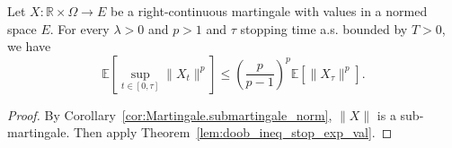 \begin{corollary}\label{cor:doob_ineq_stop_exp_val}
  Let $X:\mathbb{R}\times\Omega\rightarrow E$ be a right-continuous martingale with values in a normed space $E$.
  For every $\lambda>0$ and $p>1$ and $\tau$ stopping time a.s. bounded by $T>0$, we have
  $$
  \mathbb{E}\left[ \sup_{t\in[0,\tau]}\lVert X_t \rVert^p \right]\leq \left(\frac{p}{p-1}\right)^p\mathbb{E}[\lVert X_\tau \rVert^p].
  $$
\end{corollary}
\begin{proof}
  By Corollary~\ref{cor:Martingale.submartingale_norm}, $\lVert X \rVert$ is a sub-martingale.
  Then apply Theorem~\ref{lem:doob_ineq_stop_exp_val}.
\end{proof}
